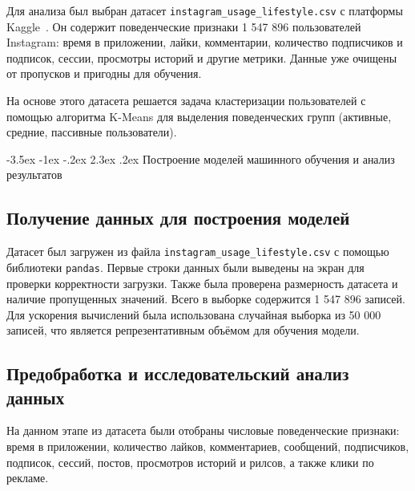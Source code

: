 \documentclass[14pt, a4paper]{extarticle}
\makeatletter
\renewcommand\section{\@startsection {section}{1}{\z@}%
                                   {-3.5ex \@plus -1ex \@minus -.2ex}%
                                   {2.3ex \@plus.2ex}%
                                   {\centering\normalfont\Large\bfseries}}
\makeatother
\begin{document}
Для анализа был выбран датасет \texttt{instagram\_usage\_lifestyle.csv} с платформы Kaggle~\cite{kaggle}. Он содержит поведенческие признаки 1 547 896 пользователей Instagram: время в приложении, лайки, комментарии, количество подписчиков и подписок, сессии, просмотры историй и другие метрики. Данные уже очищены от пропусков и пригодны для обучения.

На основе этого датасета решается задача кластеризации пользователей с помощью алгоритма K-Means для выделения поведенческих групп (активные, средние, пассивные пользователи).%


\section{Построение моделей машинного обучения и анализ результатов}

\subsection{Получение данных для построения моделей}

Датасет был загружен из файла \texttt{instagram\_usage\_lifestyle.csv} с помощью библиотеки \texttt{pandas}. Первые строки данных были выведены на экран для проверки корректности загрузки. Также была проверена размерность датасета и наличие пропущенных значений. Всего в выборке содержится 1 547 896 записей. Для ускорения вычислений была использована случайная выборка из 50 000 записей, что является репрезентативным объёмом для обучения модели.

\subsection{Предобработка и исследовательский анализ данных}

На данном этапе из датасета были отобраны числовые поведенческие признаки: время в приложении, количество лайков, комментариев, сообщений, подписчиков, подписок, сессий, постов, просмотров историй и рилсов, а также клики по рекламе.
\end{document}
